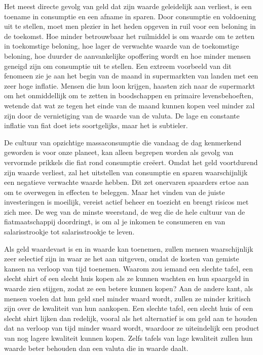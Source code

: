 Het meest directe gevolg van geld dat zijn waarde geleidelijk aan verliest, is een toename in consumptie en een afname in sparen. Door consumptie en voldoening uit te stellen, moet men plezier in het heden opgeven in ruil voor een beloning in de toekomst. Hoe minder betrouwbaar het ruilmiddel is om waarde om te zetten in toekomstige beloning, hoe lager de verwachte waarde van de toekomstige beloning, hoe duurder de aanvankelijke opoffering wordt en hoe minder mensen geneigd zijn om consumptie uit te stellen. Een extreem voorbeeld van dit fenomeen zie je aan het begin van de maand in supermarkten van landen met een zeer hoge inflatie. Mensen die hun loon krijgen, haasten zich naar de supermarkt om het onmiddellijk om te zetten in boodschappen en primaire levensbehoeften, wetende dat wat ze tegen het einde van de maand kunnen kopen veel minder zal zijn door de vernietiging van de waarde van de valuta. De lage en constante inflatie van fiat doet iets soortgelijks, maar het is subtieler.

De cultuur van opzichtige massaconsumptie die vandaag de dag kenmerkend geworden is voor onze planeet, kan alleen begrepen worden als gevolg van vervormde prikkels die fiat rond consumptie creëert. Omdat het geld voortdurend zijn waarde verliest, zal het uitstellen van consumptie en sparen waarschijnlijk een negatieve verwachte waarde hebben. Dit zet onervaren spaarders ertoe aan om te overwegen in effecten te beleggen. Maar het vinden van de juiste investeringen is moeilijk, vereist actief beheer en toezicht en brengt risico\textquotesingle s met zich mee. De weg van de minste weerstand, de weg die de hele cultuur van de fiatmaatschappij doordringt, is om al je inkomen te consumeren en van salarisstrookje tot salarisstrookje te leven.

Als geld waardevast is en in waarde kan toenemen, zullen mensen waarschijnlijk zeer selectief zijn in waar ze het aan uitgeven, omdat de kosten van gemiste kansen na verloop van tijd toenemen. Waarom zou iemand een slechte tafel, een slecht shirt of een slecht huis kopen als ze kunnen wachten en hun spaargeld in waarde zien stijgen, zodat ze een betere kunnen kopen? Aan de andere kant, als mensen voelen dat hun geld snel minder waard wordt, zullen ze minder kritisch zijn over de kwaliteit van hun aankopen. Een slechte tafel, een slecht huis of een slecht shirt lijken dan redelijk, vooral als het alternatief is om geld aan te houden dat na verloop van tijd minder waard wordt, waardoor ze uiteindelijk een product van nog lagere kwaliteit kunnen kopen. Zelfs tafels van lage kwaliteit zullen hun waarde beter behouden dan een valuta die in waarde daalt.

